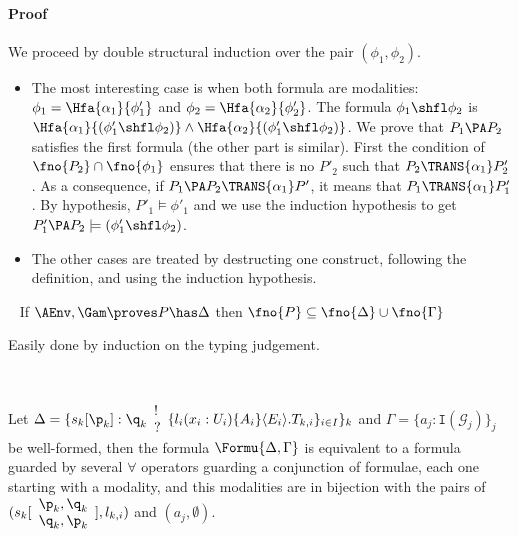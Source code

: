 \paragraph{Proof}
We proceed by double structural induction over the pair
$(\phi_1,\phi_2)$.
\begin{itemize}
\item The most interesting case is when both formula are modalities:
  $\phi_1 = \Hfa{\alpha_1}{\phi'_1}$ and $\phi_2 =
  \Hfa{\alpha_2}{\phi'_2}$. The formula $\phi_1 \shfl \phi_2$ is
  $\Hfa{\alpha_1}{(\phi'_1 \shfl \phi_2)} \land
  \Hfa{\alpha_2}{(\phi'_1 \shfl \phi_2)}$. We prove that $P_1 \PA
  P_2$ satisfies the first formula (the other part is similar). First
  the condition of $\fno{P_2} \cap \fno{\phi_1}$ ensures that there is
  no $P'_2$ such that $P_2 \TRANS{\alpha_1} P'_2$. As a consequence, if
  $P_1 \PA P_2 \TRANS{\alpha_1} P'$, it means that $P_1
  \TRANS{\alpha_1} P'_1$. By hypothesis, $P'_1 \models \phi'_1$ and we
  use the induction hypothesis to get $P'_1 \PA P_2 \models (\phi'_1
  \shfl \phi_2)$.
\item The other cases are treated by destructing one construct, following
  the definition, and using the induction hypothesis.
\end{itemize}



\begin{LEM}
~\label{lemma:hml:desfr}
If $\AEnv,\Gam \proves P\has \Delta$ then $\fno{P} \subseteq
\fno{\Delta}\cup\fno{\Gamma}$

\end{LEM}

Easily done by induction on the typing judgement.

\begin{LEM}
~\label{lemma:hml:nature}

Let $\Delta = \{ s_k[\p_k]: \q_k\begin{array}{l}! \\ ?
\end{array}
\{l_i(x_i:U_i) \{A_i\}\langle E_i\rangle.T_{k,i}\}_{i \in I} \}_k $ and $\Gamma = \{
a_j:\mathtt{I}(\mathcal{G}_j) \}_j$ be well-formed, then the formula
$\Formu{\Delta,\Gamma}$ is equivalent to a formula guarded by several
$\forall$ operators guarding a conjunction of formulae, each one
starting with a modality, and this modalities are in bijection with
the pairs of $(s_k[\begin{array}{l}\p_k,\q_k \\ \q_k,\p_k
  \end{array}
],l_{k,i})$ and $(a_j,\emptyset)$.
\end{LEM}








